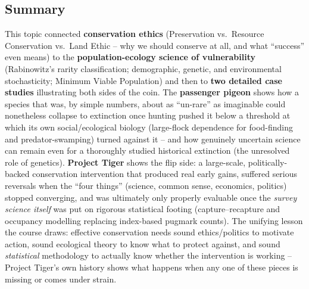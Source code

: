 \documentclass[11pt,a4paper]{article}
\begin{document}
\subsection{Summary}
\begin{keybox}
This topic connected \textbf{conservation ethics} (Preservation vs.\ Resource Conservation vs.\ Land Ethic -- why we should conserve at all, and what ``success'' even means) to the \textbf{population-ecology science of vulnerability} (Rabinowitz's rarity classification; demographic, genetic, and environmental stochasticity; Minimum Viable Population) and then to \textbf{two detailed case studies} illustrating both sides of the coin. The \textbf{passenger pigeon} shows how a species that was, by simple numbers, about as ``un-rare'' as imaginable could nonetheless collapse to extinction once hunting pushed it below a threshold at which its own social/ecological biology (large-flock dependence for food-finding and predator-swamping) turned against it -- and how genuinely uncertain science can remain even for a thoroughly studied historical extinction (the unresolved role of genetics). \textbf{Project Tiger} shows the flip side: a large-scale, politically-backed conservation intervention that produced real early gains, suffered serious reversals when the ``four things'' (science, common sense, economics, politics) stopped converging, and was ultimately only properly evaluable once the \emph{survey science itself} was put on rigorous statistical footing (capture--recapture and occupancy modelling replacing index-based pugmark counts). The unifying lesson the course draws: effective conservation needs sound ethics/politics to motivate action, sound ecological theory to know what to protect against, and sound \emph{statistical} methodology to actually know whether the intervention is working -- Project Tiger's own history shows what happens when any one of these pieces is missing or comes under strain.
\end{keybox}
\end{document}
